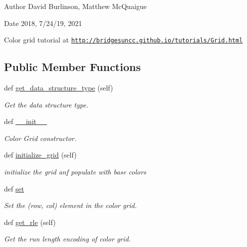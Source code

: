 \begin{DoxyAuthor}{Author}
David Burlinson, Matthew Mc\+Quaigue
\end{DoxyAuthor}
\begin{DoxyDate}{Date}
2018, 7/24/19, 2021
\end{DoxyDate}
Color grid tutorial at \href{http://bridgesuncc.github.io/tutorials/Grid.html}{\tt http\+://bridgesuncc.\+github.\+io/tutorials/\+Grid.\+html} \subsection*{Public Member Functions}
\begin{DoxyCompactItemize}
\item 
def \hyperlink{classbridges_1_1color__grid_1_1_color_grid_a4dbf23124fdc8edae222c100cf7b9363}{get\+\_\+data\+\_\+structure\+\_\+type} (self)
\begin{DoxyCompactList}\small\item\em Get the data structure type. \end{DoxyCompactList}\item 
def \hyperlink{classbridges_1_1color__grid_1_1_color_grid_aa4b484e518b5fc0c970ea36e8500dbe5}{\+\_\+\+\_\+init\+\_\+\+\_\+}
\begin{DoxyCompactList}\small\item\em Color Grid constructor. \end{DoxyCompactList}\item 
def \hyperlink{classbridges_1_1color__grid_1_1_color_grid_ad2b3ab19751cbf629096a25e31bb7f42}{initialize\+\_\+grid} (self)
\begin{DoxyCompactList}\small\item\em initialize the grid anf populate with base colors \end{DoxyCompactList}\item 
def \hyperlink{classbridges_1_1color__grid_1_1_color_grid_a746dde66b828253bd0dfb32c906729fe}{set}
\begin{DoxyCompactList}\small\item\em Set the (row, col) element in the color grid. \end{DoxyCompactList}\item 
def \hyperlink{classbridges_1_1color__grid_1_1_color_grid_a48ded4391e60e4f42213fb3711730614}{get\+\_\+rle} (self)
\begin{DoxyCompactList}\small\item\em Get the run length encoding of color grid. \end{DoxyCompactList}\item 

\end{DoxyCompactItemize}
